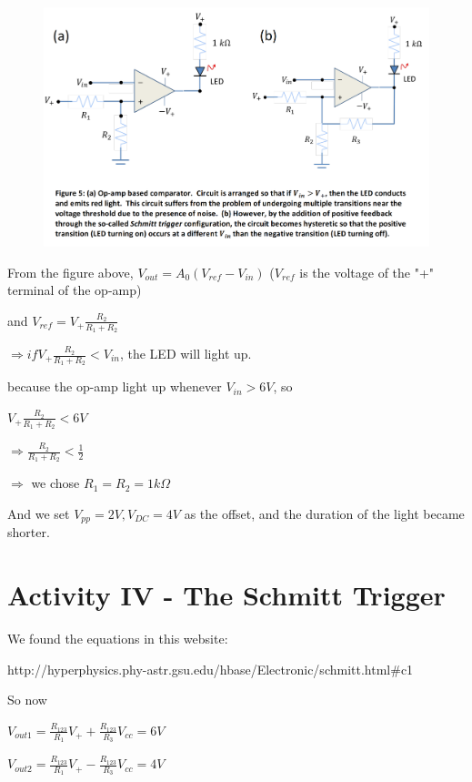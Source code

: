 \documentclass[11pt]{article}
\begin{document}
\begin{figure}[H]
 \begin{center}
  \includegraphics[width=\linewidth/1]{act3}
  \caption{}
  \label{fig:act3}
 \end{center}
\end{figure}

From the figure above, $V_{out}=A_{0}(V_{ref}-V_{in})$ ($V_{ref}$ is the voltage of the "+" terminal of the op-amp)

and $V_{ref}=V_{+}\frac{R_{2}}{R_{1}+R_{2}}$

$\Rightarrow if V_{+}\frac{R_{2}}{R_{1}+R_{2}}<V_{in}$, the LED will light up.

because the op-amp light up whenever $V_{in}>6V$, so

$V_{+}\frac{R_{2}}{R_{1}+R_{2}}<6V$

$\Rightarrow \frac{R_{2}}{R_{1}+R_{2}}<\frac{1}{2}$

$\Rightarrow$ we chose $R_{1}=R_{2}=1 k \Omega$

And we set $V_{pp}=2V, V_{DC}=4V$ as the offset, and the duration of the light became shorter.

\section{Activity IV - The Schmitt Trigger}

We found the equations in this website:

http://hyperphysics.phy-astr.gsu.edu/hbase/Electronic/schmitt.html\#c1

So now 

$V_{out1}=\frac{R_{123}}{R_{1}}V_{+}+\frac{R_{123}}{R_{3}}V_{cc}=6V$

$V_{out2}=\frac{R_{123}}{R_{1}}V_{+}-\frac{R_{123}}{R_{3}}V_{cc}=4V$
\end{document}
